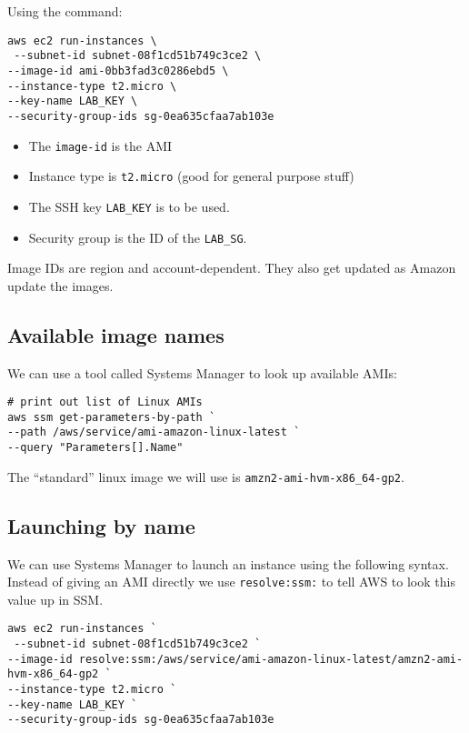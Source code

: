 \documentclass{pgnotes}
\begin{document}
Using the command: 

\begin{verbatim}
aws ec2 run-instances \
 --subnet-id subnet-08f1cd51b749c3ce2 \
--image-id ami-0bb3fad3c0286ebd5 \
--instance-type t2.micro \
--key-name LAB_KEY \
--security-group-ids sg-0ea635cfaa7ab103e
\end{verbatim}

\begin{itemize}
\item The \texttt{image-id} is the AMI 
\item Instance type is \texttt{t2.micro} (good for general purpose stuff)
\item The SSH key \texttt{LAB\_KEY} is to be used.
\item Security group is the ID of the \texttt{LAB\_SG}. 
\end{itemize}

Image IDs are region and account-dependent.
They also get updated as Amazon update the images.

\subsection{Available image names}

We can use a tool called Systems Manager to look up available AMIs:

\begin{verbatim}
# print out list of Linux AMIs
aws ssm get-parameters-by-path `
--path /aws/service/ami-amazon-linux-latest `
--query "Parameters[].Name"
\end{verbatim}
The ``standard'' linux image we will use is \texttt{amzn2-ami-hvm-x86\_64-gp2}.

\subsection{Launching by name}

We can use Systems Manager to launch an instance using the following syntax.
Instead of giving an AMI directly we use \texttt{resolve:ssm:} to tell AWS to look this value up in SSM. 
\begin{verbatim}
aws ec2 run-instances `
 --subnet-id subnet-08f1cd51b749c3ce2 `
--image-id resolve:ssm:/aws/service/ami-amazon-linux-latest/amzn2-ami-hvm-x86_64-gp2 `
--instance-type t2.micro `
--key-name LAB_KEY `
--security-group-ids sg-0ea635cfaa7ab103e

\end{verbatim}
\end{document}

